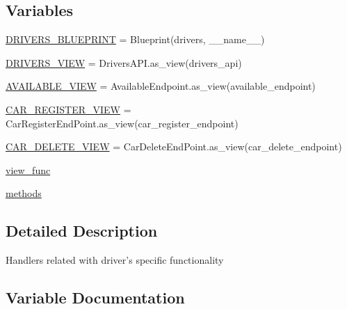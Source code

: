 \subsection*{Variables}
\begin{DoxyCompactItemize}
\item 
\hyperlink{namespaceserver_1_1src_1_1handlers_1_1_drivers_handler_a2c1d2669f6e617b959332d523f8fbcc7}{D\+R\+I\+V\+E\+R\+S\+\_\+\+B\+L\+U\+E\+P\+R\+I\+NT} = Blueprint(\textquotesingle{}drivers\textquotesingle{}, \+\_\+\+\_\+name\+\_\+\+\_\+)
\item 
\hyperlink{namespaceserver_1_1src_1_1handlers_1_1_drivers_handler_a2de23c61550d05c2739cbe8d7e0ceaeb}{D\+R\+I\+V\+E\+R\+S\+\_\+\+V\+I\+EW} = Drivers\+A\+P\+I.\+as\+\_\+view(\textquotesingle{}drivers\+\_\+api\textquotesingle{})
\item 
\hyperlink{namespaceserver_1_1src_1_1handlers_1_1_drivers_handler_ac8aaa47e84a448d1319186a424a08705}{A\+V\+A\+I\+L\+A\+B\+L\+E\+\_\+\+V\+I\+EW} = Available\+Endpoint.\+as\+\_\+view(\textquotesingle{}available\+\_\+endpoint\textquotesingle{})
\item 
\hyperlink{namespaceserver_1_1src_1_1handlers_1_1_drivers_handler_aef78289c84185700fe7afcde60dfeb34}{C\+A\+R\+\_\+\+R\+E\+G\+I\+S\+T\+E\+R\+\_\+\+V\+I\+EW} = Car\+Register\+End\+Point.\+as\+\_\+view(\textquotesingle{}car\+\_\+register\+\_\+endpoint\textquotesingle{})
\item 
\hyperlink{namespaceserver_1_1src_1_1handlers_1_1_drivers_handler_a8ca29fb02445457afdbe41bbea4b467a}{C\+A\+R\+\_\+\+D\+E\+L\+E\+T\+E\+\_\+\+V\+I\+EW} = Car\+Delete\+End\+Point.\+as\+\_\+view(\textquotesingle{}car\+\_\+delete\+\_\+endpoint\textquotesingle{})
\item 
\hyperlink{namespaceserver_1_1src_1_1handlers_1_1_drivers_handler_af37c168b94ff719ffb324453c5c1cd06}{view\+\_\+func}
\item 
\hyperlink{namespaceserver_1_1src_1_1handlers_1_1_drivers_handler_a3634d5c3f882ab668da5e543eaec9be9}{methods}
\end{DoxyCompactItemize}


\subsection{Detailed Description}
\begin{DoxyVerb}Handlers related with driver's specific functionality\end{DoxyVerb}
 

\subsection{Variable Documentation}
